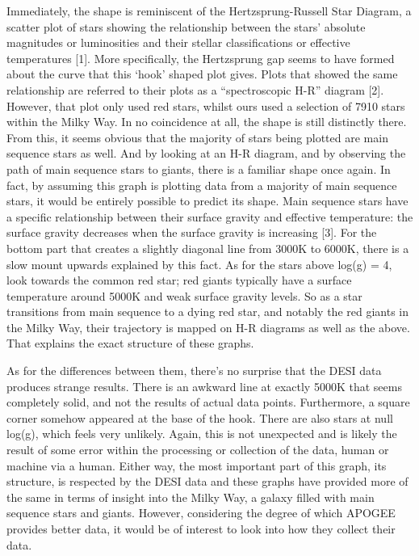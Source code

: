 \documentclass{article}
\begin{document}
\indent Immediately, the shape is reminiscent of the Hertzsprung-Russell Star Diagram, a scatter plot of stars showing the relationship between the stars' absolute magnitudes or luminosities and their stellar classifications or effective temperatures [1]. More specifically, the Hertzsprung gap seems to have formed about the curve that this ‘hook’ shaped plot gives. Plots that showed the same relationship are referred to their plots as a “spectroscopic H-R” diagram [2]. However, that plot only used red stars, whilst ours used a selection of 7910 stars within the Milky Way. In no coincidence at all, the shape is still distinctly there. From this, it seems obvious that the majority of stars being plotted are main sequence stars as well. And by looking at an H-R diagram, and by observing the path of main sequence stars to giants, there is a familiar shape once again. In fact, by assuming this graph is plotting data from a majority of main sequence stars, it would be entirely possible to predict its shape. Main sequence stars have a specific relationship between their surface gravity and effective temperature: the surface gravity decreases when the surface gravity is increasing [3]. For the bottom part that creates a slightly diagonal line from 3000K to 6000K, there is a slow mount upwards explained by this fact. As for the stars above log(g) = 4, look towards the common red star; red giants typically have a surface temperature around 5000K and weak surface gravity levels. So as a star transitions from main sequence to a dying red star, and notably the red giants in the Milky Way, their trajectory is mapped on H-R diagrams as well as the above. That explains the exact structure of these graphs.

\indent As for the differences between them, there’s no surprise that the DESI data produces strange results. There is an awkward line at exactly 5000K that seems completely solid, and not the results of actual data points. Furthermore, a square corner somehow appeared at the base of the hook. There are also stars at null log(g), which feels very unlikely. Again, this is not unexpected and is likely the result of some error within the processing or collection of the data, human or machine via a human. Either way, the most important part of this graph, its structure, is respected by the DESI data and these graphs have provided more of the same in terms of insight into the Milky Way, a galaxy filled with main sequence stars and giants. However, considering the degree of which APOGEE provides better data, it would be of interest to look into how they collect their data.\\
\end{document}
